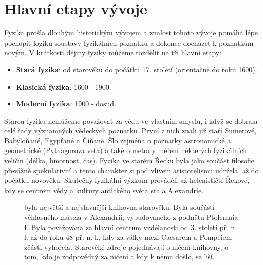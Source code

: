   \section{Hlavní etapy vývoje}\label{fyz:IchapIsecIII}
    Fyzika prošla dlouhým historickým vývojem a znalost tohoto vývoje pomáhá lépe pochopit logiku 
    soustavy fyzikálních poznatků a dokonce do\-cházet k poznatkům novým. V krátkosti dějiny 
    fyziky můžeme rozdělit na tři hlavní etapy:
    \begin{itemize}[noitemsep]
     	\item \textbf{Stará fyzika}: od starověku do počátku 17. století (orientačně do roku 1600).
      \item \textbf{Klasická fyzika}: 1600 - 1900.
      \item \textbf{Moderní fyzika}: 1900 - dosud.
    \end{itemize}
    Starou fyziku nemůžeme považovat za vědu ve vlastním smyslu, i když se dobrala celé řady 
    významných vědeckých poznatku. První z nich znali již staří Sumerové, Babyloňané, Egypťané a 
    Číňané. Šlo zejména o  poznatky astronomické a geometrické (Pythagorova veta) a také o metody 
    měření některých fyzikálních veličin (délka, hmotnost, čas). Fyzika ve starém Řecku byla jako 
    součást filosofie převážně spekulativní a tento charakter si pod vlivem aristotelismu udržela, 
    až do počátku novověku. Skutečný fyzikální výzkum prováděli až helenističtí Řekové, kdy se 
    centrem vědy a kultury antického světa stala Alexandrie. 
    
    \begin{figure}[ht!]  %
      \centering
      \caption{ \wikiAlexLib byla největší a nejslavnější knihovna starověku. Byla součástí
                věhlasného múseia v Alexandrii, vybudovaného z podnětu Ptolemaia I. Byla považována
                za hlavní centrum vzdělanosti od 3. století př. n. l. až do roku 48 př. n. l., kdy
                za války mezi Caesarem a Pompeiem zčásti vyhořela. Starověké zdroje pojednávají o
                ničení knihovny, o tom, kdo je zodpovědný za ničení a kdy k němu došlo, se liší.}
      \label{fyz:fig894}
    \end{figure} 

